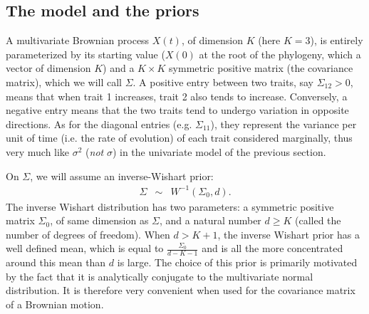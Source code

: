 \documentclass[usletter]{article}
\begin{document}
\subsection*{The model and the priors}

A multivariate Brownian process $X(t)$, of dimension $K$ (here $K=3$),
is entirely parameterized by its starting value ($X(0)$ at the root of the phylogeny, which a vector of dimension $K$) and a $K \times K$ symmetric positive matrix (the covariance matrix), which we will call $\Sigma$.
A positive entry between two traits, say $\Sigma_{12} > 0$, means that when trait 1 increases, trait 2 also tends to increase. Conversely, a negative entry means that the two traits tend to undergo variation in opposite directions.
As for the diagonal entries (e.g. $\Sigma_{11}$), they represent the variance per unit of time (i.e. the rate of evolution) of each trait considered marginally,
thus very much like $\sigma^2$ (\emph{not} $\sigma$) in the univariate model of the previous section.

On $\Sigma$, we will assume an inverse-Wishart prior:
\begin{eqnarray*}
\Sigma &\sim& W^{-1}(\Sigma_0, d).
\end{eqnarray*}
The inverse Wishart distribution has two parameters: a symmetric positive matrix $\Sigma_0$, of same dimension as $\Sigma$, and a natural number $d \ge K$ (called the number of degrees of freedom). When $d > K+1$, the inverse Wishart prior has a well defined mean, which is equal to $\frac{\Sigma_0}{d-K-1}$ and is all the more concentrated around this mean than $d$ is large.
The choice of this prior is primarily motivated by the fact that it is analytically conjugate to the multivariate normal distribution. It is therefore very convenient when used for the covariance matrix of a Brownian motion.
\end{document}
